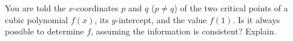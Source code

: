 You are told the $x$-coordinates $p$ and $q$ ($p\ne q$) of the two critical points of a cubic polynomial $f(x)$, its $y$-intercept, and the value $f(1)$. Is it always possible to determine $f$, assuming the information is consistent? Explain.
